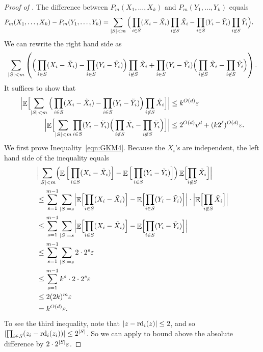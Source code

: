 \documentclass{toc}
\def\eps{\varepsilon}
\def\Blocklength{\ell}
\def\rd{\textnormal{rd}}
\DeclarePairedDelimiter{\abs}{\lvert}{\rvert}
\DeclareMathOperator*{\E}{\mathbb{E}}                 %
\begin{document}
  \begin{proof}[Proof of {}]
    The difference between $P_m(X_1, \ldots, X_k)$ and $P_m(Y_1, \ldots, Y_k)$ equals
    \begin{align*}
      P_m(X_1, \ldots, X_k) - P_m(Y_1, \ldots, Y_k)
        &= \sum_{\abs{S} < m} \Big( \prod_{i \in S} (X_i - \tilde X_i) \prod_{i \not\in S} \tilde X_i - \prod_{i \in S} (Y_i - \tilde Y_i) \prod_{i \not\in S} \tilde Y_i \Big) .
    \end{align*}
    We can rewrite the right hand side as
    \[
      \sum_{\abs{S} < m} \left( \Big( \prod_{i \in S} (X_i - \tilde X_i) - \prod_{i \in S} (Y_i - \tilde Y_i) \Big) \prod_{i \not\in S} \tilde X_i + \prod_{i \in S} (Y_i - \tilde Y_i) \Big( \prod_{i \not\in S} \tilde X_i - \prod_{i \not\in S} \tilde Y_i \Big) \right) .
    \]
    It suffices to show that
    \begin{align}
      \Bigl| \E \Bigl[ \sum_{\abs{S} < m} \Big( \prod_{i \in S} (X_i - \tilde X_i) - \prod_{i \in S} (Y_i - \tilde Y_i) \Big) \prod_{i \not\in S} \tilde X_i \Bigr] \Bigr| 
      &\le k^{O(d)} \eps \label{eqn:GKM4} \\
      \Bigl| \E \Bigl[ \sum_{\abs{S} < m} \prod_{i \in S} (Y_i - \tilde Y_i) \Big( \prod_{i \not\in S} \tilde X_i - \prod_{i \not\in S} \tilde Y_i \Big) \Bigr] \Bigr| 
      &\le 2^{O(d)} v^d + (k 2^\Blocklength)^{O(d)} \eps . \label{eqn:GKM5}
    \end{align}
    We first prove Inequality~\eqref{eqn:GKM4}.
    Because the $X_i$'s are independent, the left hand side of the inequality equals
    \begin{align*}
      &\Bigl| \sum_{\abs{S} < m} \Bigl( \E \Big[ \prod_{i \in S} (X_i - \tilde X_i) \Big] - \E \Big[ \prod_{i \in S} (Y_i - \tilde Y_i) \Big] \Bigr) \E \Bigl[ \prod_{i \not\in S} \tilde X_i \Bigr] \Bigr| \\
      &\le \sum_{s = 1}^{m - 1} \sum_{ \abs{S} = s } \Bigl| \E \Bigl[ \prod_{i \in S} (X_i - \tilde X_i) \Bigr] - \E \Bigl[ \prod_{i \in S} (Y_i - \tilde Y_i) \Bigr] \Bigr| \cdot \Bigl| \E \Bigl[ \prod_{i \not\in S} \tilde X_i \Bigr] \Bigr| \\
      &\le \sum_{s = 1}^{m - 1} \sum_{ \abs{S} = s } \Bigl| \E \Bigl[
        \prod_{i \in S} (X_i - \tilde X_i) \Bigr] - \E \Bigl[ \prod_{i \in S}
        (Y_i - \tilde Y_i) \Bigr] \Bigr| \\
      &\le \sum_{s = 1}^{m - 1} \sum_{ \abs{S} = s } 2 \cdot 2^s \eps \\
      &\le \sum_{s = 1}^{m - 1} k^s \cdot  2 \cdot 2^s \eps \\
      &\le 2 (2k)^m \eps \\
      &= k^{O(d)} \eps.
    \end{align*}
    To see the third inequality, note that $\abs{z - \rd_i(z)} \le 2$, and so $\abs{\prod_{i \in S} (z_i - \rd_i(z_i))} \le 2^{\abs{S}}$.
    So we can apply  to bound above the absolute difference by $2 \cdot 2^{\abs{S}} \eps$.


\end{proof}
\end{document}
